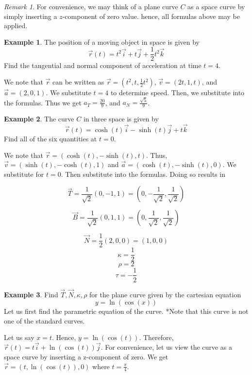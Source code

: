 \documentclass[11pt]{article}
\theoremstyle{plain} %
\theoremstyle{definition}
\theoremstyle{example}
\newtheorem*{example}{Example}
\theoremstyle{remark}
\newtheorem*{remark}{Remark}
\begin{document}
\begin{remark}
For convenience, we may think of a plane curve $C$ as a space curve by simply inserting a $z$-component of zero value. hence, all formulas above may be applied.
\end{remark}

\begin{example}
The position of a moving object in space is given by $$\vec{r}(t) = t^2\vec{i} + t\vec{j} + \frac{1}{2}t^2\vec{k}$$
Find the tangential and normal component of acceleration at time $t=4$. 
\end{example}
We note that $\vec{r}$ can be written as $\vec{r} = \left(t^2, t, \frac{1}{2}t^2 \right)$, $\vec{v} = \left(2t, 1, t \right)$, and  $\vec{a} = \left(2, 0,1 \right)$. We substitute $t=4$ to determine speed. Then, we substitute into the formulas. Thus we get $a_T = \frac{20}{9}$, and $a_N = \frac{\sqrt 5}{9}$.


\begin{example}
The curve $C$ in three space is given by 
$$\vec{r}(t) = \cosh (t) \vec{i} - \sinh (t)\vec{j} + t \vec{k}$$
Find all of the six quantities at $t = 0$. \end{example}We note that $\vec{r} = \left(\cosh (t) , - \sinh (t),t \right)$. Thus, $\vec{v} = \left(\sinh (t) , - \cosh (t),1 \right)$ and $\vec{a} = \left(\cosh (t) , - \sinh (t),0\right)$. We substitute for $t=0$. Then substitute into the formulas. Doing so results in

$$\vec{T} = \frac{1}{\sqrt{2}}(0,-1,1) = \left(0,-\frac{1}{\sqrt{2}}, \frac{1}{\sqrt{2}}\right)$$

$$\vec{B} = \frac{1}{\sqrt{2}}(0,1,1) = \left(0, \frac{1}{\sqrt{2}}, \frac{1}{\sqrt{2}}\right)$$

$$\vec{N} = \frac{1}{2}(2,0,0) = (1,0,0)$$
$$\kappa = \frac{1}{2}$$
$$\rho = 2$$
$$\tau = -\frac{1}{2}$$


\begin{example}
Find $\vec{T}, \vec{N}, \kappa, \rho$ for the plane curve given by the cartesian equation $$y = \ln (\cos (x))$$
Let us first find the parametric equation of the curve. *Note that this curve is not one of the standard curves. \end{example}

Let us say $x = t$. Hence, $y = \ln (\cos (t))$. Therefore, $\vec{r}(t) = t\vec{i} + \ln (\cos (t))\vec{j}$. For convenience, let us view the curve as a space curve by inserting a z-component of zero. We get $\vec{r} = \left(t, \ln (\cos (t)), 0\right)$ where $t=\frac{\pi}{4}$. 
\end{document}
